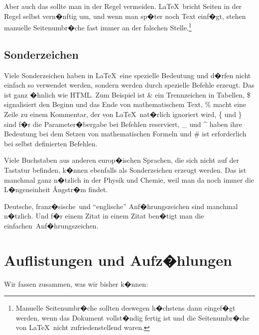 \documentclass[11pt,a4paper]{article} %
\begin{document}
\newpage

Aber auch das sollte man in der Regel vermeiden. \LaTeX\ bricht Seiten in der Regel selbst vern�nftig um, und wenn man sp�ter noch Text einf�gt, stehen manuelle Seitenumbr�che fast immer an der falschen Stelle.\footnote{Manuelle Seitenumbr�che sollten deswegen h�chstens dann eingef�gt werden, wenn das Dokument vollst�ndig fertig ist und die Seitenumbr�che von \LaTeX\ nicht zufriedenstellend waren.}

\subsection{Sonderzeichen}
\label{Sonderzeichen}

Viele Sonderzeichen haben in \LaTeX\ eine spezielle Bedeutung und d�rfen nicht einfach so verwendet werden, sondern werden durch spezielle Befehle erzeugt. Das ist ganz �hnlich wie HTML. Zum Beispiel ist \& ein Trennzeichen in Tabellen, \$ signalisiert den Beginn und das Ende von mathematischem Text, \% macht eine Zeile zu einem Kommentar, der von \LaTeX\ nat�rlich ignoriert wird, \{ und \} sind f�r die Parameter�bergabe bei Befehlen reserviert, \_ und \^{} haben ihre Bedeutung bei dem Setzen von mathematischen Formeln und \# ist erforderlich bei selbst definierten Befehlen.

Viele Buchstaben aus anderen europ�ischen Sprachen, die sich nicht auf der Tastatur befinden, k�nnen ebenfalls als Sonderzeichen erzeugt werden. Das ist manchmal ganz n�tzlich in der Physik und Chemie, weil man da noch immer die L�ngeneinheit \AA ngstr�m findet. 

\glqq Deutsche\grqq, \flqq franz�sische\frqq\ und ``englische'' Anf�hrungszeichen sind manchmal n�tzlich. Und f�r einem Zitat in einem Zitat ben�tigt man die \glq einfachen\grq\ Anf�hrungszeichen. 


\section{Auflistungen und Aufz�hlungen}
\label{Listen}


Wir fassen zusammen, was wir bisher k�nnen:
\end{document}
